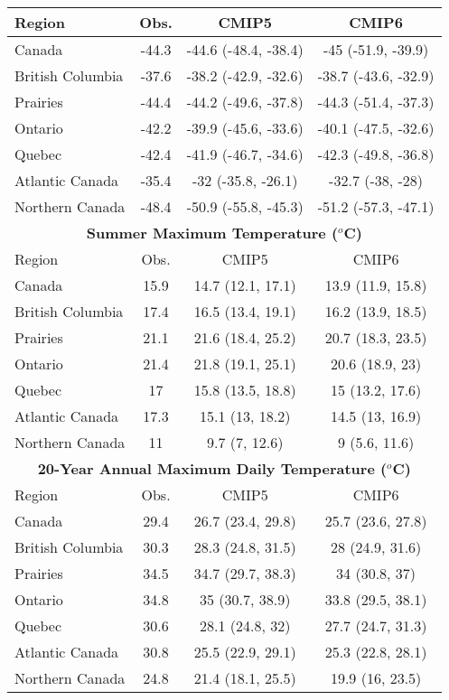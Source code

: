\documentclass[]{scrartcl}
\begin{document}
\begin{table}[t]
\begin{center}
\begin{tabular}{|l|ccc|}
			\hline
			Region & Obs. & CMIP5 & CMIP6   \\
			\hline
			Canada & -44.3 & -44.6 (-48.4, -38.4) & -45 (-51.9, -39.9) \\ 
			British Columbia & -37.6 & -38.2 (-42.9, -32.6) & -38.7 (-43.6, -32.9) \\ 
			Prairies & -44.4 & -44.2 (-49.6, -37.8) & -44.3 (-51.4, -37.3) \\ 
			Ontario & -42.2 & -39.9 (-45.6, -33.6) & -40.1 (-47.5, -32.6) \\ 
			Quebec & -42.4 & -41.9 (-46.7, -34.6) & -42.3 (-49.8, -36.8) \\ 
			Atlantic Canada & -35.4 & -32 (-35.8, -26.1) & -32.7 (-38, -28) \\ 
			Northern Canada & -48.4 & -50.9 (-55.8, -45.3) & -51.2 (-57.3, -47.1) \\ 			
			\hline	
			\multicolumn{4}{|c|}{\textbf{Summer Maximum Temperature ($^o$C)}} \\
			\hline
			Region & Obs. & CMIP5 & CMIP6   \\
			\hline
			Canada & 15.9 & 14.7 (12.1, 17.1) & 13.9 (11.9, 15.8) \\ 
			British Columbia & 17.4 & 16.5 (13.4, 19.1) & 16.2 (13.9, 18.5) \\ 
			Prairies & 21.1 & 21.6 (18.4, 25.2) & 20.7 (18.3, 23.5) \\ 
			Ontario & 21.4 & 21.8 (19.1, 25.1) & 20.6 (18.9, 23) \\ 
			Quebec & 17 & 15.8 (13.5, 18.8) & 15 (13.2, 17.6) \\ 
			Atlantic Canada & 17.3 & 15.1 (13, 18.2) & 14.5 (13, 16.9) \\ 
			Northern Canada & 11 & 9.7 (7, 12.6) & 9 (5.6, 11.6) \\ 	
			\hline	
			\multicolumn{4}{|c|}{\textbf{20-Year Annual Maximum Daily Temperature ($^o$C)}} \\
			\hline
			Region & Obs. & CMIP5 & CMIP6   \\
			\hline
			Canada & 29.4 & 26.7 (23.4, 29.8) & 25.7 (23.6, 27.8) \\ 
			British Columbia & 30.3 & 28.3 (24.8, 31.5) & 28 (24.9, 31.6) \\ 
			Prairies & 34.5 & 34.7 (29.7, 38.3) & 34 (30.8, 37) \\ 
			Ontario & 34.8 & 35 (30.7, 38.9) & 33.8 (29.5, 38.1) \\ 
			Quebec & 30.6 & 28.1 (24.8, 32) & 27.7 (24.7, 31.3) \\ 
			Atlantic Canada & 30.8 & 25.5 (22.9, 29.1) & 25.3 (22.8, 28.1) \\ 
			Northern Canada & 24.8 & 21.4 (18.1, 25.5) & 19.9 (16, 23.5) \\ 

			\hline				
		\end{tabular}
	\end{center}
\end{table}
\end{document}
